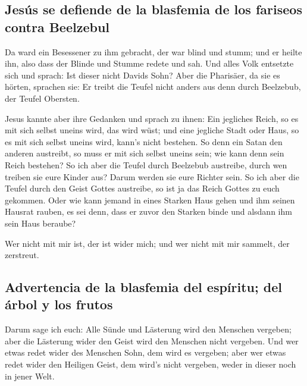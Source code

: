 \hypertarget{jesuxfas-se-defiende-de-la-blasfemia-de-los-fariseos-contra-beelzebul}{%
\subsection{Jesús se defiende de la blasfemia de los fariseos contra
Beelzebul}\label{jesuxfas-se-defiende-de-la-blasfemia-de-los-fariseos-contra-beelzebul}}

 Da ward ein Besessener zu ihm gebracht, der war blind
und stumm; und er heilte ihn, also dass der Blinde und Stumme redete und
sah.  Und alles Volk entsetzte sich und sprach: Ist
dieser nicht Davids Sohn?  Aber die Pharisäer, da sie es
hörten, sprachen sie: Er treibt die Teufel nicht anders aus denn durch
Beelzebub, der Teufel Obersten.

 Jesus kannte aber ihre Gedanken und sprach zu ihnen: Ein
jegliches Reich, so es mit sich selbst uneins wird, das wird wüst; und
eine jegliche Stadt oder Haus, so es mit sich selbst uneins wird, kann's
nicht bestehen.  So denn ein Satan den anderen austreibt,
so muss er mit sich selbst uneins sein; wie kann denn sein Reich
bestehen?  So ich aber die Teufel durch Beelzebub
austreibe, durch wen treiben sie eure Kinder aus? Darum werden sie eure
Richter sein.  So ich aber die Teufel durch den Geist
Gottes austreibe, so ist ja das Reich Gottes zu euch gekommen.
 Oder wie kann jemand in eines Starken Haus gehen und ihm
seinen Hausrat rauben, es sei denn, dass er zuvor den Starken binde und
alsdann ihm sein Haus beraube?

 Wer nicht mit mir ist, der ist wider mich; und wer nicht
mit mir sammelt, der zerstreut.

\hypertarget{advertencia-de-la-blasfemia-del-espuxedritu-del-uxe1rbol-y-los-frutos}{%
\subsection{Advertencia de la blasfemia del espíritu; del árbol y los
frutos}\label{advertencia-de-la-blasfemia-del-espuxedritu-del-uxe1rbol-y-los-frutos}}

 Darum sage ich euch: Alle Sünde und Lästerung wird den
Menschen vergeben; aber die Lästerung wider den Geist wird den Menschen
nicht vergeben.  Und wer etwas redet wider des Menschen
Sohn, dem wird es vergeben; aber wer etwas redet wider den Heiligen
Geist, dem wird's nicht vergeben, weder in dieser noch in jener Welt.

